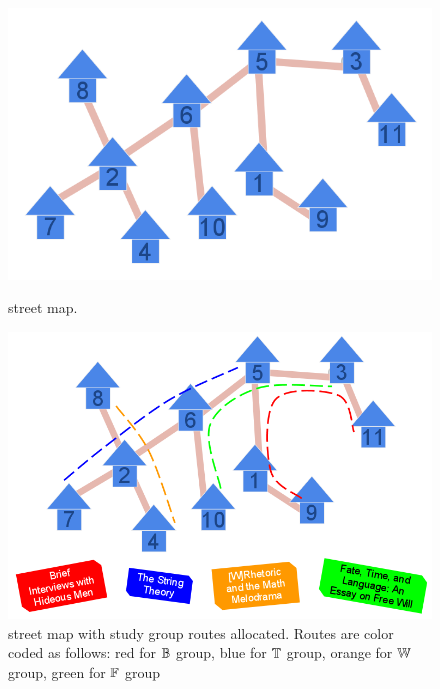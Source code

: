 \begin{figure}[htbp] %
  \centering
  \includegraphics[scale=0.2]{../img/1_infinite_loop.png}
  \caption{\figtabsize {\residenceblock} street map.}
  \label{fig:streetmap}

  \includegraphics[scale=0.2]{../img/2_infinite_loop_BTWF.png}
  \caption[\figtabsize \residenceblock street map with study group
    routes allocated.]{\figtabsize {\residenceblock} street map with study group
    routes allocated. Routes are color coded as follows: red for
    \textcolor{red}{$\mathbb{B}$} group, blue for \textcolor{blue}{$\mathbb{T}$}
    group, orange for \textcolor{yellow}{$\mathbb{W}$} group, green for
    \textcolor{green}{$\mathbb{F}$} group}
  \label{fig:streetmappath}


\end{figure}
